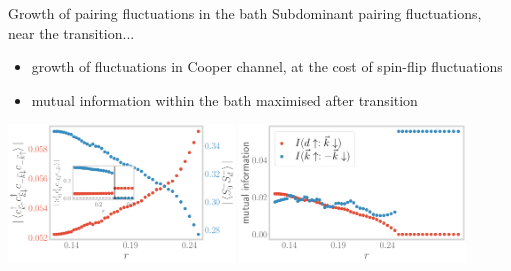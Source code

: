 \documentclass[8pt,aspectratio=169]{beamer}
\newcommand{\nitem}{\item[\ding{51}]}
\begin{document}
\begin{frame}{Growth of pairing fluctuations in the bath}
\centering
\alert{Subdominant pairing fluctuations}, near the transition...

\vspace*{\fill}

\begin{minipage}{0.42\textwidth}
\begin{itemize}
	\nitem growth of fluctuations in Cooper channel, at the cost of spin-flip fluctuations
\end{itemize}
\end{minipage}
\hspace*{\fill}
\begin{minipage}{0.4\textwidth}
\begin{itemize}
	\nitem mutual information within the bath maximised after transition
\end{itemize}
\end{minipage}

\vspace*{\fill}

\includegraphics[width=0.45\textwidth]{spinflip-pairing.pdf}
\hspace*{\fill}
\includegraphics[width=0.45\textwidth]{I_k.pdf}
\end{frame}
\end{document}

